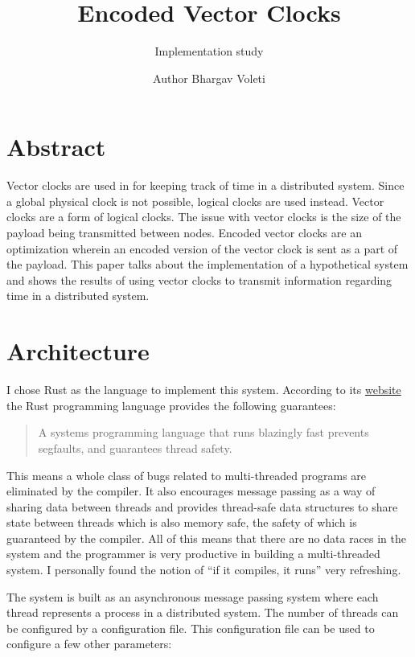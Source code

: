 \documentclass[]{article}
\title{Encoded Vector Clocks}
\author{Implementation study}
\date{Author Bhargav Voleti}
\begin{document}
\maketitle

\hypertarget{abstract}{%
\section{Abstract}\label{abstract}}

Vector clocks are used in for keeping track of time in a distributed
system. Since a global physical clock is not possible, logical clocks
are used instead. Vector clocks are a form of logical clocks. The issue
with vector clocks is the size of the payload being transmitted between
nodes. Encoded vector clocks are an optimization wherein an encoded
version of the vector clock is sent as a part of the payload. This paper
talks about the implementation of a hypothetical system and shows the
results of using vector clocks to transmit information regarding time in
a distributed system.

\hypertarget{architecture}{%
\section{Architecture}\label{architecture}}

I chose Rust as the language to implement this system. According to its
\href{https://www.rust-lang.org/en-US/}{website} the Rust programming
language provides the following guarantees:

\begin{quote}
A systems programming language that runs blazingly fast prevents
segfaults, and guarantees thread safety.
\end{quote}

This means a whole class of bugs related to multi-threaded programs are
eliminated by the compiler. It also encourages message passing as a way
of sharing data between threads and provides thread-safe data structures
to share state between threads which is also memory safe, the safety of
which is guaranteed by the compiler. All of this means that there are no
data races in the system and the programmer is very productive in
building a multi-threaded system. I personally found the notion of ``if
it compiles, it runs'' very refreshing.

The system is built as an asynchronous message passing system where each
thread represents a process in a distributed system. The number of
threads can be configured by a configuration file. This configuration
file can be used to configure a few other parameters:
\end{document}
